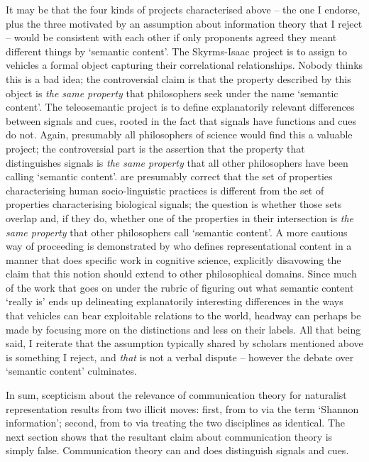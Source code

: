 It may be that the four kinds of projects characterised above -- the one I endorse, plus the three motivated by an assumption about information theory that I reject -- would be consistent with each other if only proponents agreed they meant different things by `semantic content'.
The Skyrms-Isaac project is to assign to vehicles a formal object capturing their correlational relationships.
Nobody thinks this is a bad idea; the controversial claim is that the property described by this object is \textit{the same property} that philosophers seek under the name `semantic content'.
The teleosemantic project is to define explanatorily relevant differences between signals and cues, rooted in the fact that signals have functions and cues do not.
Again, presumably all philosophers of science would find this a valuable project; the controversial part is the assertion that the property that distinguishes signals is \textit{the same property} that all other philosophers have been calling `semantic content'.
\citet{hutto2013radicalizing} are presumably correct that the set of properties characterising human socio-linguistic practices is different from the set of properties characterising biological signals; the question is whether those sets overlap and, if they do, whether one of the properties in their intersection is \textit{the same property} that other philosophers call `semantic content'.
A more cautious way of proceeding is demonstrated by \citet{shea2018representation} who defines representational content in a manner that does specific work in cognitive science, explicitly disavowing the claim that this notion should extend to other philosophical domains.
Since much of the work that goes on under the rubric of figuring out what semantic content `really is' ends up delineating explanatorily interesting differences in the ways that vehicles can bear exploitable relations to the world, headway can perhaps be made by focusing more on the distinctions and less on their labels.
All that being said, I reiterate that the assumption typically shared by scholars mentioned above is something I reject, and \textit{that} is not a verbal dispute -- however the debate over `semantic content' culminates.

In sum, scepticism about the relevance of communication theory for naturalist representation results from two illicit moves: first, from \ami{} to \ait{} via the term `Shannon information'; second, from \ait{} to \act{} via treating the two disciplines as identical.
The next section shows that the resultant claim about communication theory is simply false.
Communication theory can and does distinguish signals and cues.


